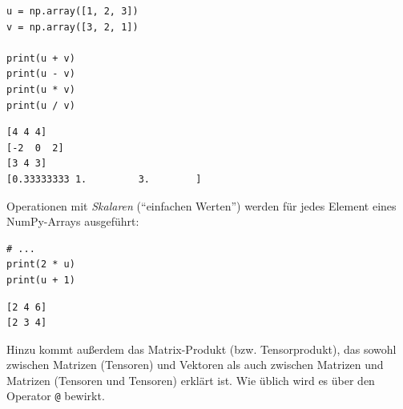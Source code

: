\begin{tcbraster}[raster columns=2,
                  raster equal height,
                  nobeforeafter,
                  raster column skip=0.5cm]
\begin{codebox}
\begin{verbatim}
u = np.array([1, 2, 3])
v = np.array([3, 2, 1])

print(u + v)
print(u - v)
print(u * v)
print(u / v)
\end{verbatim}
\end{codebox}
%
\begin{cmdbox}
\begin{verbatim}
[4 4 4]
[-2  0  2]
[3 4 3]
[0.33333333 1.         3.        ]
\end{verbatim}
\end{cmdbox}
\end{tcbraster}

Operationen mit \emph{Skalaren} (\enquote{einfachen Werten}) werden für jedes Element eines NumPy-Arrays ausgeführt:

\begin{tcbraster}[raster columns=2,
                  raster equal height,
                  nobeforeafter,
                  raster column skip=0.5cm]
\begin{codebox}
\begin{verbatim}
# ...
print(2 * u)
print(u + 1)
\end{verbatim}
\end{codebox}
%
\begin{cmdbox}
\begin{verbatim}
[2 4 6]
[2 3 4]
\end{verbatim}
\end{cmdbox}
\end{tcbraster}

Hinzu kommt außerdem das Matrix-Produkt (bzw. Tensorprodukt), das sowohl zwischen Matrizen (Tensoren) und Vektoren als auch zwischen Matrizen und Matrizen (Tensoren und Tensoren) erklärt ist. Wie üblich wird es über den Operator \texttt{@} bewirkt.

